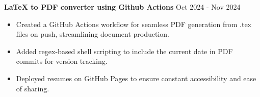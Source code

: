 \documentclass[a4paper,9pt]{extarticle}
\begin{document}
\noindent
\textbf{LaTeX to PDF converter using Github Actions} \hfill Oct 2024 - Nov 2024%
\begin{itemize}
    \item Created a GitHub Actions workflow for seamless PDF generation from .tex files on push, streamlining document production.
    \item Added regex-based shell scripting to include the current date in PDF commits for version tracking.
    \item Deployed resumes on GitHub Pages to ensure constant accessibility and ease of sharing.
\end{itemize}

\end{document}

